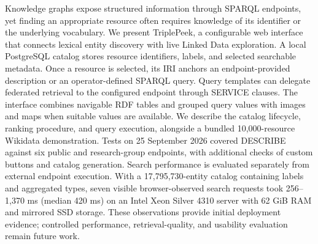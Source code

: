 Knowledge graphs expose structured information through SPARQL endpoints, yet finding an appropriate resource often requires knowledge of its identifier or the underlying vocabulary. We present TriplePeek, a configurable web interface that connects lexical entity discovery with live Linked Data exploration. A local PostgreSQL catalog stores resource identifiers, labels, and selected searchable metadata. Once a resource is selected, its IRI anchors an endpoint-provided description or an operator-defined SPARQL query. Query templates can delegate federated retrieval to the configured endpoint through SERVICE clauses. The interface combines navigable RDF tables and grouped query values with images and maps when suitable values are available. We describe the catalog lifecycle, ranking procedure, and query execution, alongside a bundled 10,000-resource Wikidata demonstration. Tests on 25 September 2026 covered DESCRIBE against six public and research-group endpoints, with additional checks of custom buttons and catalog generation. Search performance is evaluated separately from external endpoint execution. With a 17,795,730-entity catalog containing labels and aggregated types, seven visible browser-observed search requests took 256--1,370 ms (median 420 ms) on an Intel Xeon Silver 4310 server with 62 GiB RAM and mirrored SSD storage. These observations provide initial deployment evidence; controlled performance, retrieval-quality, and usability evaluation remain future work.
